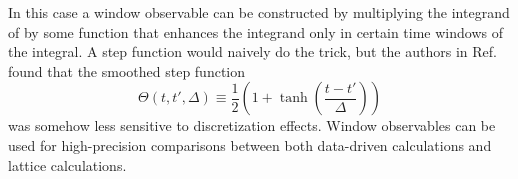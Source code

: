 In this case a window observable
can be constructed by multiplying the integrand of  by some
function that enhances the integrand only in certain time windows of the
integral. A step function would naively do the trick, but the authors
in Ref.~\cite{blum_calculation_2018} found that the smoothed step function
\begin{equation}
  \Theta(t,t',\Delta)\equiv\frac{1}{2}\left(1+\tanh\left(\frac{t-t'}{\Delta}\right)\right)
\end{equation}
was somehow less sensitive to discretization effects.
Window observables can be used for high-precision comparisons between both
data-driven calculations and lattice calculations.



